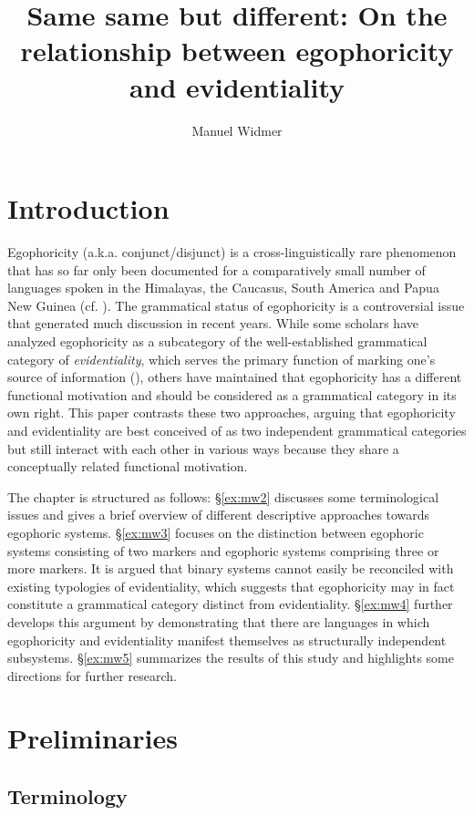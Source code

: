 \documentclass[output=paper]{langsci/langscibook}
\author{Manuel Widmer \affiliation{University of Zurich}}
\title{Same same but different: On the relationship between egophoricity and evidentiality}
\begin{document}
\maketitle

\section{Introduction}\label{s:mw1}

Egophoricity (a.k.a. conjunct/disjunct) is a cross-linguistically rare phenomenon that has so far only been documented for a comparatively small number of languages spoken in the Himalayas, the Caucasus, South America and Papua New Guinea (cf. \citealt{Creissels2008}). The grammatical status of egophoricity is a controversial issue that generated much discussion in recent years. While some scholars have analyzed egophoricity as a subcategory of the well-established grammatical category of \textit{evidentiality}, which serves the primary function of marking one’s source of information (\citealt{Aikhenvald2004}), others have maintained that egophoricity has a different functional motivation and should be considered as a grammatical category in its own right. This paper contrasts these two approaches, arguing that egophoricity and evidentiality are best conceived of as two independent grammatical categories but still interact with each other in various ways because they share a conceptually related functional motivation.

The chapter is structured as follows: §\ref{ex:mw2} discusses some terminological issues and gives a brief overview of different descriptive approaches towards egophoric systems. §\ref{ex:mw3} focuses on the distinction between egophoric systems consisting of two markers and egophoric systems comprising three or more markers. It is argued that binary systems cannot easily be reconciled with existing typologies of evidentiality, which suggests that egophoricity may in fact constitute a grammatical category distinct from evidentiality. §\ref{ex:mw4} further develops this argument by demonstrating that there are languages in which egophoricity and evidentiality manifest themselves as structurally independent subsystems. §\ref{ex:mw5} summarizes the results of this study and highlights some directions for further research.

\section{Preliminaries}\label{s:mw2}
\subsection{Terminology}\label{s:mw2-1}
\end{document}
